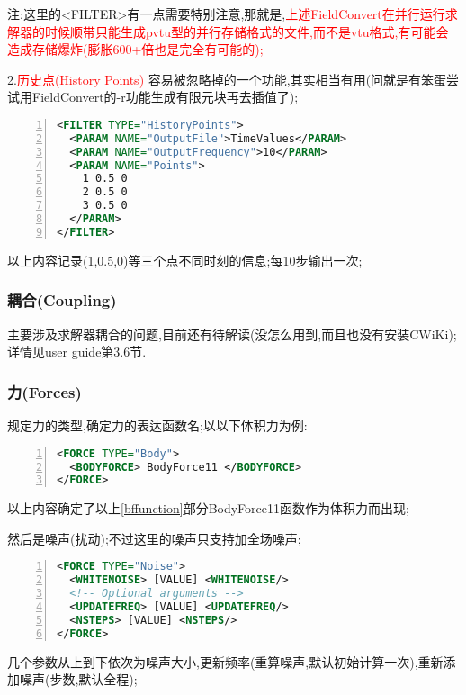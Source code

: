 注:这里的<FILTER>有一点需要特别注意,那就是,\textcolor{red}{上述FieldConvert在并行运行求解器的时候顺带只能生成pvtu型的并行存储格式的文件,而不是vtu格式,有可能会造成存储爆炸(膨胀600+倍也是完全有可能的);}

2.\textcolor{red}{历史点(History Points)}
容易被忽略掉的一个功能,其实相当有用(问就是有笨蛋尝试用FieldConvert的-r功能生成有限元块再去插值了);
\begin{lstlisting}[frame=single,numbers=left,language=XML]
<FILTER TYPE="HistoryPoints">
  <PARAM NAME="OutputFile">TimeValues</PARAM>
  <PARAM NAME="OutputFrequency">10</PARAM>
  <PARAM NAME="Points">
    1 0.5 0
    2 0.5 0
    3 0.5 0
  </PARAM>
</FILTER>
\end{lstlisting}
\par
以上内容记录(1,0.5,0)等三个点不同时刻的信息;每10步输出一次;

\subsubsection{耦合(Coupling)}
主要涉及求解器耦合的问题,目前还有待解读(没怎么用到,而且也没有安装CWiKi);详情见user guide第3.6节.

\subsubsection{力(Forces)}
规定力的类型,确定力的表达函数名;以以下体积力为例:\par
\begin{lstlisting}[frame=single,numbers=left,language=XML]
<FORCE TYPE="Body">
  <BODYFORCE> BodyForce11 </BODYFORCE>
</FORCE>
\end{lstlisting}
\par
以上内容确定了以上\ref{bffunction}部分BodyForce11函数作为体积力而出现;\par

然后是噪声(扰动);不过这里的噪声只支持加全场噪声;
\begin{lstlisting}[frame=single,numbers=left,language=XML]
<FORCE TYPE="Noise">
  <WHITENOISE> [VALUE] <WHITENOISE/>
  <!-- Optional arguments -->
  <UPDATEFREQ> [VALUE] <UPDATEFREQ/>
  <NSTEPS> [VALUE] <NSTEPS/>
</FORCE>
\end{lstlisting}
\par
几个参数从上到下依次为噪声大小,更新频率(重算噪声,默认初始计算一次),重新添加噪声(步数,默认全程);

